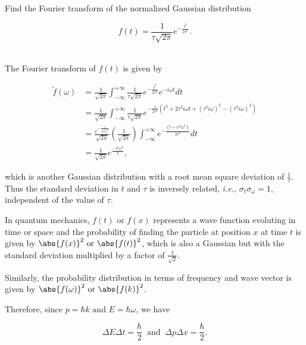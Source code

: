 \documentclass[english,a4paper,12pt]{report}
\begin{document}
{Find the Fourier transform of the normalized Gaussian distribution 

\begin{equation}
    f(t) = \frac{1}{\tau \sqrt{2\pi } } e^{-\frac{t^2}{2\tau ^2} }.
\end{equation}~
}
{The Fourier transform of \(f(t)\) is given by 

\begin{equation}
    \begin{aligned} 
    \tilde{f}(\omega ) &= \frac{1}{\sqrt{2\pi } } \int_{-\infty}^{+\infty} \frac{1}{\tau \sqrt{2\pi } } e^{-\frac{t^2}{2\tau ^2} } e^{-i \omega t}dt \\
    &= \frac{1}{\sqrt{2\pi } } \int_{-\infty}^{+\infty} \frac{1}{\tau \sqrt{2\pi } } e^{-\frac{1}{2\tau ^2} (t^2 + 2\tau ^2i \omega t + (\tau ^2i \omega )^2 - (\tau ^2 i \omega )^2) } \\
    &= \frac{e^{-\frac{1}{2\tau ^2\omega ^2} } }{\sqrt{2\pi } } \left( \frac{1}{\sqrt{2\pi } }  \right) \int_{-\infty}^{+\infty} e^{-\frac{(t+i\tau ^2\omega ^2)}{2\tau ^2} }dt \\
    &= \frac{1}{\sqrt{2\pi } } e^{\frac{-\tau ^2\omega ^2}{2} },     
    \end{aligned}         
\end{equation}

which is another Gaussian distribution with a root mean square deviation of \(\frac{1}{\tau } \). Thus the standard deviation in \(t \text { and } \tau \) is inversely related, \textit{i.e.,} \(\sigma _{t}\sigma _{\omega }=1  \), independent of the value of \(\tau \). 

In quantum mechanics, \(f(t) \text { or }  f(x)\) represents a wave function evoluting in time or space and the probability of finding the particle at position \(x\) at time \(t\) is given by \(\abs{f(x)}^2 \text { or } \abs{f(t)}^2  \), which is also a Gaussian but with the standard deviation multiplied by a factor of \(\frac{1}{\sqrt{2} } \). 

Similarly, the probability distribution in terms of frequency and wave vector is given by \(\abs{f(\omega )}^2 \text { or } \abs{f(k)}^2 \). 

Therefore, since \(p = \hbar k \text { and } E = \hbar \omega \), we have 

\begin{equation}
    \Delta E \Delta t = \frac{\hbar }{2} ~\text { and }~ \Delta p\Delta x = \frac{\hbar }{2}.  
\end{equation}


} 
\end{document}
